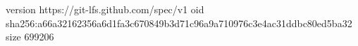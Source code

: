 version https://git-lfs.github.com/spec/v1
oid sha256:a66a32162356a6d1fa3c670849b3d71c96a9a710976c3e4ac31ddbc80ed5ba32
size 699206
